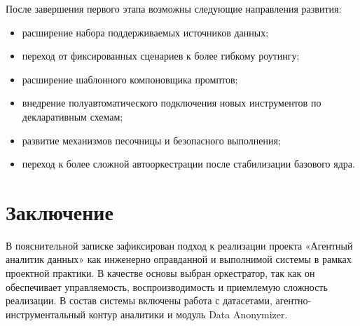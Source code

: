 \documentclass[14pt,a4paper]{extarticle}
\begin{document}
После завершения первого этапа возможны следующие направления развития:
\begin{itemize}
    \item расширение набора поддерживаемых источников данных;
    \item переход от фиксированных сценариев к более гибкому роутингу;
    \item расширение шаблонного компоновщика промптов;
    \item внедрение полуавтоматического подключения новых инструментов по декларативным схемам;
    \item развитие механизмов песочницы и безопасного выполнения;
    \item переход к более сложной автооркестрации после стабилизации базового ядра.
\end{itemize}


\section{Заключение}

В пояснительной записке зафиксирован подход к реализации проекта «Агентный аналитик данных» как инженерно оправданной и выполнимой системы в рамках проектной практики. В качестве основы выбран оркестратор, так как он обеспечивает управляемость, воспроизводимость и приемлемую сложность реализации. В состав системы включены работа с датасетами, агентно-инструментальный контур аналитики и модуль Data Anonymizer.
\end{document}
